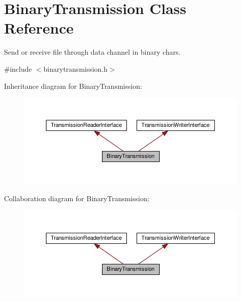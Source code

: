 \hypertarget{classBinaryTransmission}{}\section{Binary\+Transmission Class Reference}
\label{classBinaryTransmission}


Send or receive file through data channel in binary chars.  




{\ttfamily \#include $<$binarytransmission.\+h$>$}



Inheritance diagram for Binary\+Transmission\+:
\nopagebreak
\begin{figure}[H]
\begin{center}
\leavevmode
\includegraphics[width=350pt]{classBinaryTransmission__inherit__graph}
\end{center}
\end{figure}


Collaboration diagram for Binary\+Transmission\+:
\nopagebreak
\begin{figure}[H]
\begin{center}
\leavevmode
\includegraphics[width=350pt]{classBinaryTransmission__coll__graph}
\end{center}
\end{figure}
